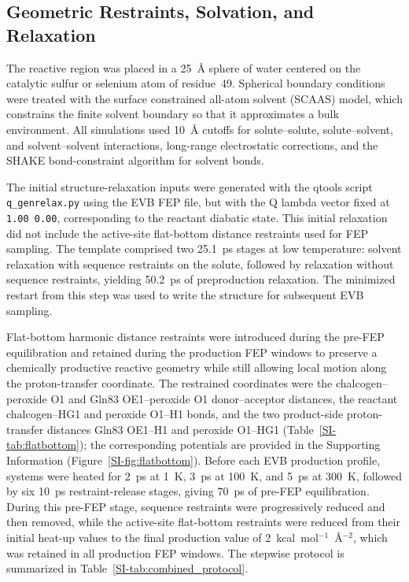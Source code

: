 \subsection{Geometric Restraints, Solvation, and Relaxation}

The reactive region was placed in a 25~\AA{} sphere of water centered on the catalytic sulfur or selenium atom of residue~49. Spherical boundary conditions were treated with the surface constrained all-atom solvent (SCAAS) model, which constrains the finite solvent boundary so that it approximates a bulk environment.\cite{king_surface_1989} All simulations used 10~\AA{} cutoffs for solute--solute, solute--solvent, and solvent--solvent interactions, long-range electrostatic corrections, and the SHAKE bond-constraint algorithm for solvent bonds.

The initial structure-relaxation inputs were generated with the qtools script \texttt{q\_genrelax.py}\cite{PurgBauer2017Qtools} using the EVB FEP file, but with the Q lambda vector fixed at \texttt{1.00 0.00}, corresponding to the reactant diabatic state. This initial relaxation did not include the active-site flat-bottom distance restraints used for FEP sampling. The template comprised two 25.1~ps stages at low temperature: solvent relaxation with sequence restraints on the solute, followed by relaxation without sequence restraints, yielding 50.2~ps of preproduction relaxation. The minimized restart from this step was used to write the structure for subsequent EVB sampling.

Flat-bottom harmonic distance restraints were introduced during the pre-FEP equilibration and retained during the production FEP windows to preserve a chemically productive reactive geometry while still allowing local motion along the proton-transfer coordinate.  The restrained coordinates were the chalcogen--peroxide O1 and Gln83 OE1--peroxide O1 donor--acceptor distances, the reactant chalcogen--HG1 and peroxide O1--H1 bonds, and the two product-side proton-transfer distances Gln83 OE1--H1 and peroxide O1--HG1 (Table~\ref{SI-tab:flatbottom}); the corresponding potentials are provided in the Supporting Information (Figure~\ref{SI-fig:flatbottom}). Before each EVB production profile, systems were heated for 2~ps at 1~K, 3~ps at 100~K, and 5~ps at 300~K, followed by six 10~ps restraint-release stages, giving 70~ps of pre-FEP equilibration. During this pre-FEP stage, sequence restraints were progressively reduced and then removed, while the active-site flat-bottom restraints were reduced from their initial heat-up values to the final production value of 2~kcal~mol$^{-1}$~\AA$^{-2}$, which was retained in all production FEP windows. The stepwise protocol is summarized in Table~\ref{SI-tab:combined_protocol}.

